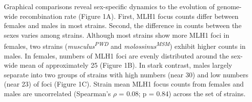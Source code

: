 \documentclass[
]{article}
\begin{document}
Graphical comparisons reveal sex-specific dynamics to the evolution of
genome-wide recombination rate (Figure 1A). First, MLH1 focus counts
differ between females and males in most strains. Second, the difference
in counts between the sexes varies among strains. Although most strains
show more MLH1 foci in females, two strains
(\emph{musculus\textsuperscript{PWD}} and
\emph{molossinus\textsuperscript{MSM}}) exhibit higher counts in males.
In females, numbers of MLH1 foci are evenly distributed around the
sex-wide mean of approximately 25 (Figure 1B). In stark contrast, males
largely separate into two groups of strains with high numbers (near 30)
and low numbers (near 23) of foci (Figure 1C). Strain mean MLH1 focus
counts from females and males are uncorrelated (Spearman's \(\rho\) =
0.08; p = 0.84) across the set of strains.
\end{document}
